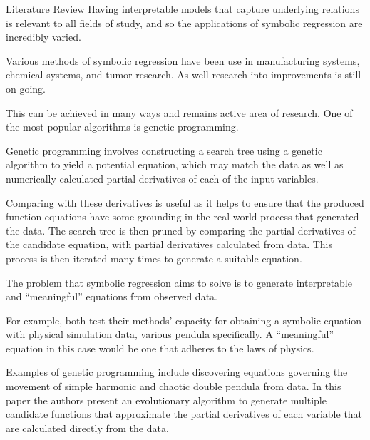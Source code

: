 \documentclass[12pt]{amsart}
\begin{document}
\begin{section}{Literature Review}
        Having interpretable models that capture underlying relations is relevant to all fields of study, and so the applications of symbolic regression are incredibly varied. 

        Various methods of symbolic regression have been use in manufacturing systems, chemical systems, and tumor research\cite{can2011comparison,keith2021combining,yoshihara2013inferring}. As well research into improvements is still on going.

        This can be achieved in many ways and remains active area of research. One of the most popular algorithms is genetic programming\cite{schmidt2009distilling}. 
        
        Genetic programming involves constructing a search tree using a genetic algorithm to yield a potential equation, which may match the data as well as numerically calculated partial derivatives of each of the input variables. 
        
        Comparing with these derivatives is useful as it helps to ensure that the produced function equations have some grounding in the real world process that generated the data. The search tree is then pruned by comparing the partial derivatives of the candidate equation, with partial derivatives calculated from data. This process is then iterated many times to generate a suitable equation.

        The problem that symbolic regression aims to solve is to generate interpretable and ``meaningful'' equations from observed data. 
        
        For example, both  test their methods' capacity for obtaining a symbolic equation with physical simulation data, various pendula specifically. A ``meaningful'' equation in this case would be one that adheres to the laws of physics.

        Examples of genetic programming include discovering equations governing the movement of simple harmonic and chaotic double pendula from data\cite{schmidt2009distilling}. In this paper the authors present an evolutionary algorithm to generate multiple candidate functions that approximate the partial derivatives of each variable that are calculated directly from the data. 
        

\end{section}
\end{document}
